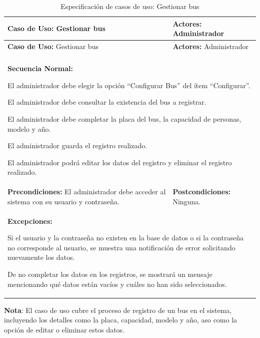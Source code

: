 \begingroup

	\begin{longtable}{m{7.5cm}|m{7.5cm}}
		\caption[Especificación de casos de uso: Gestionar bus]{\newline Especificación de casos de uso: Gestionar bus} \label{tab:tabla3_3}\\
		\toprule
		\textbf{Caso de Uso:} Gestionar bus & \textbf{Actores:} Administrador \\
		\midrule
		\endfirsthead
	
		\textbf{Caso de Uso:} Gestionar bus & \textbf{Actores:} Administrador \\
		\midrule
		\endhead
	
		\bottomrule
		\endlastfoot
	
		\multicolumn{2}{m{15cm}}{\textbf{Descripción:} Este caso de uso hace referencia al registro de los datos de un bus.} \\ \hline
	
		\multicolumn{2}{m{15cm}}{\textbf{Secuencia Normal:}
		
			El administrador debe elegir la opción “Configurar Bus” del ítem “Configurar”.
		
			El administrador debe consultar la existencia del bus a registrar.
		
			El administrador debe completar la placa del bus, la capacidad de personas, modelo y año.
		
			El administrador guarda el registro realizado.
		
			El administrador podrá editar los datos del registro y eliminar el registro realizado.
		} \\ \hline
	
		\textbf{Precondiciones:} El administrador debe acceder al sistema con su usuario y contraseña. & \textbf{Postcondiciones:} Ninguna. \\ \hline
	
		\multicolumn{2}{m{15cm}}{\textbf{Excepciones:}
		
			Si el usuario y la contraseña no existen en la base de datos o si la contraseña no corresponde al usuario, se muestra una notificación de error solicitando nuevamente los datos.
		
			De no completar los datos en los registros, se mostrará un mensaje mencionando qué datos están vacíos y cuáles no han sido seleccionados.
		} \\
	\end{longtable}
	\endgroup
	\vspace{-6pt}  %
	\textbf{Nota}: El caso de uso cubre el proceso de registro de un bus en el sistema, incluyendo los detalles como la placa, capacidad, modelo y año, aso como la opción de editar o eliminar estos datos.

